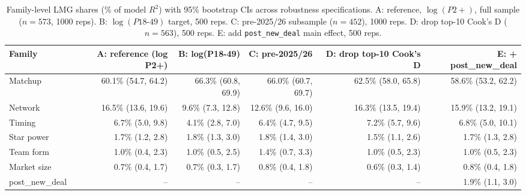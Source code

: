\begin{table}[ht]
\centering
\caption{Family-level LMG shares (\% of model $R^2$) with 95\% bootstrap CIs across robustness specifications. A: reference, $\log(P2+)$, full sample ($n=573$, 1000 reps). B: $\log(P18\text{-}49)$ target, 500 reps. C: pre-2025/26 subsample ($n=452$), 1000 reps. D: drop top-10 Cook's D ($n=563$), 500 reps. E: add \texttt{post\_new\_deal} main effect, 500 reps.} 
\label{tab:robustness}
\begin{tabular}{lrrrrr}
  \toprule
Family & A: reference (log P2+) & B: log(P18-49) & C: pre-2025/26 & D: drop top-10 Cook's D & E: + post_new_deal \\ 
  \midrule
Matchup & 60.1\% (54.7, 64.2) & 66.3\% (60.8, 69.9) & 66.0\% (60.7, 69.7) & 62.5\% (58.0, 65.8) & 58.6\% (53.2, 62.2) \\ 
  Network & 16.5\% (13.6, 19.6) & 9.6\% (7.3, 12.8) & 12.6\% (9.6, 16.0) & 16.3\% (13.5, 19.4) & 15.9\% (13.2, 19.1) \\ 
  Timing & 6.7\% (5.0, 9.8) & 4.1\% (2.8, 7.0) & 6.4\% (4.7, 9.5) & 7.2\% (5.7, 9.6) & 6.8\% (5.0, 10.1) \\ 
  Star power & 1.7\% (1.2, 2.8) & 1.8\% (1.3, 3.0) & 1.8\% (1.4, 3.0) & 1.5\% (1.1, 2.6) & 1.7\% (1.3, 2.8) \\ 
  Team form & 1.0\% (0.4, 2.3) & 1.0\% (0.5, 2.5) & 1.4\% (0.7, 3.3) & 1.0\% (0.5, 2.3) & 1.0\% (0.5, 2.3) \\ 
  Market size & 0.7\% (0.4, 1.7) & 0.7\% (0.3, 1.7) & 0.8\% (0.4, 1.8) & 0.6\% (0.3, 1.4) & 0.8\% (0.4, 1.8) \\ 
  post_new_deal & -- & -- & -- & -- & 1.9\% (1.1, 3.0) \\ 
   \bottomrule
\end{tabular}
\end{table}
